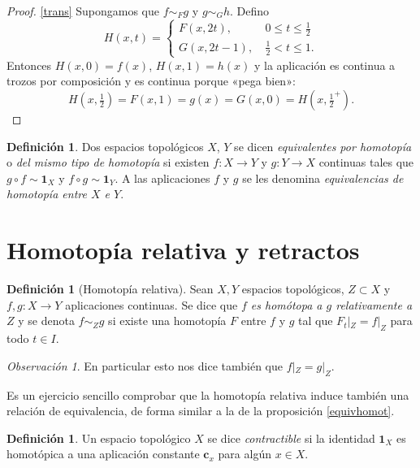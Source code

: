 \documentclass[12pt,a4paper]{book}
\theoremstyle{definition} \newtheorem{defn}[thm]{Definición}
\theoremstyle{definition} \newtheorem{ejemplo}[thm]{Ejemplo}
\theoremstyle{definition} \newtheorem{ejercicio}[thm]{Ejercicio}
\theoremstyle{remark} \newtheorem*{obs}{Observación}
\def\id{\mathbf{1}}
\def\cc{\mathbf{c}}
\begin{document}
\begin{proof}
      \ref{trans} Supongamos que $f\sim_F g$ y $g\sim_G h$. Defino
      \begin{equation*}
	H(x,t)=
	\begin{cases}
	  F(x,2t), & \ 0\leq t \leq \tfrac{1}{2} \\ 
	  G(x,2t-1), & \ \tfrac{1}{2} < t \leq 1.
	\end{cases}
      \end{equation*}
      Entonces $H(x,0)=f(x)$, $H(x,1)=h(x)$ y la aplicación es continua a trozos por composición y es continua porque «pega bien»: 
      \begin{equation*}
	H(x,\tfrac{1}{2})=F(x,1)=g(x)=G(x,0)=H(x,\tfrac{1}{2}^+).
      \end{equation*}
\end{proof}

\begin{defn}
  Dos espacios topológicos $X$, $Y$ se dicen \emph{equivalentes por homotopía} o \emph{del mismo tipo de homotopía} si existen $f:X\rightarrow Y$ y $g:Y\rightarrow X$ continuas tales que $g\circ f \sim \id_X$ y $f\circ g \sim \id_Y$. A las aplicaciones $f$ y $g$ se les denomina \emph{equivalencias de homotopía entre $X$ e $Y$}.
\end{defn}

\section{Homotopía relativa y retractos}
\begin{defn}[Homotopía relativa]
  Sean $X,Y$ espacios topológicos, $Z \subset X$ y $f,g:X\rightarrow Y$ aplicaciones continuas. Se dice que \emph{$f$ es homótopa a $g$ relativamente a $Z$} y se denota $f\sim_Z g$ si existe una homotopía $F$ entre $f$ y $g$ tal que $F_t|_Z = f|_Z$ para todo $t\in I$.	
\end{defn}
\begin{obs}
  En particular esto nos dice también que $f|_Z= g|_Z$. 
\end{obs}

Es un ejercicio sencillo comprobar que la homotopía relativa induce también una relación de equivalencia, de forma similar a la de la proposición \ref{equivhomot}.

\begin{defn}
  Un espacio topológico $X$ se dice \emph{contractible} si la identidad $\id_X$ es homotópica a una aplicación constante $\cc_x$ para algún $x \in X$.
\end{defn}
\end{document}
